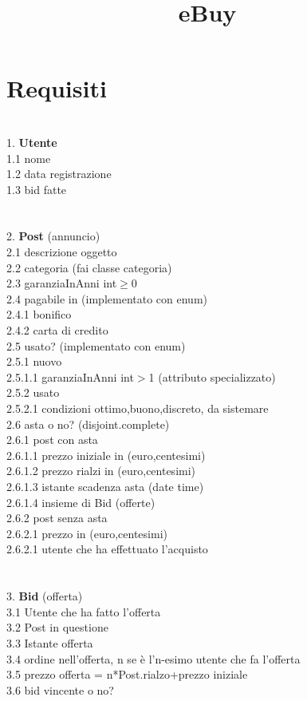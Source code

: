 \documentclass[12pt, letterpaper]{article}
\title{\textbf{eBuy}}
\date{}
\newcommand{\acc}{\\\hphantom{}\\}
\newcommand{\id}{{\hphantom{ident}}}
\begin{document}
\maketitle\section{Requisiti}
\hphantom{a}\\
1.  \textbf{Utente}\\
\id	1.1 nome\\
\id	1.2 data registrazione\\
\id	1.3 bid fatte\\
\acc
2.  \textbf{Post} (annuncio)\\
\id2.1 descrizione oggetto\\
\id2.2 categoria (fai classe categoria)\\
\id	2.3 garanziaInAnni int$\ge$0\\
\id	2.4 pagabile in (implementato con enum)\\
\id\id		2.4.1 bonifico\\
\id\id		2.4.2 carta di credito\\
\id	2.5 usato? (implementato con enum)\\
\id\id		2.5.1 nuovo\\
\id\id\id			2.5.1.1 garanziaInAnni int$>$1 (attributo specializzato)\\
\id\id	2.5.2 usato\\
\id\id\id		2.5.2.1 condizioni {ottimo,buono,discreto, da sistemare}\\
\id2.6 asta o no? (disjoint.complete)\\
\id\id		2.6.1 post con asta\\
\id\id\id		2.6.1.1 prezzo iniziale in (euro,centesimi)\\
\id\id\id		2.6.1.2 prezzo rialzi in (euro,centesimi)\\
\id\id\id		2.6.1.3 istante scadenza asta (date time)\\
\id\id\id		2.6.1.4 insieme di Bid (offerte)\\
\id\id	2.6.2 post senza asta\\
        \id\id\id		2.6.2.1 prezzo in (euro,centesimi)\\
        \id\id\id		2.6.2.1 utente che ha effettuato l'acquisto\\
\acc
3. \textbf{Bid} (offerta)\\
\id	3.1 Utente che ha fatto l'offerta\\
\id	3.2 Post in questione\\
    \id	3.3 Istante offerta \\
    \id	3.4 ordine nell'offerta, n se è l'n-esimo utente che fa l'offerta\\
    \id	3.5 prezzo offerta = n*Post.rialzo+prezzo iniziale\\
    \id	3.6 bid vincente o no?\\
\end{document}
